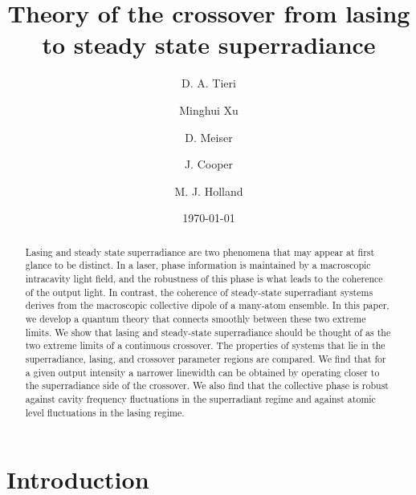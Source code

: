 \documentclass[aps,
twocolumn,
showpacs,
superscriptaddress,groupedaddress]{revtex4}
\begin{document}
\title{Theory of the crossover from lasing to steady state superradiance}
\author{D. A. Tieri}
\author{Minghui Xu}
\author{D. Meiser}
\author{J. Cooper}
\author{M. J. Holland}
\date{\today}

\begin{abstract}
  Lasing and steady state superradiance are two phenomena that may
  appear at first glance to be distinct.  In a laser, phase
  information is maintained by a macroscopic intracavity light field,
  and the robustness of this phase is what leads to the coherence of
  the output light.  In contrast, the coherence of steady-state
  superradiant systems derives from the macroscopic collective dipole
  of a many-atom ensemble.  In this paper, we develop a quantum theory
  that connects smoothly between these two extreme limits.  We show
  that lasing and steady-state superradiance should be thought of as
  the two extreme limits of a continuous crossover. The properties of
  systems that lie in the superradiance, lasing, and crossover
  parameter regions are compared.  We find that for a given output
  intensity a narrower linewidth can be obtained by operating closer
  to the superradiance side of the crossover.  We also find that the
  collective phase is robust against cavity frequency fluctuations in
  the superradiant regime and against atomic level fluctuations in the
  lasing regime.
\end{abstract}



\maketitle


\section{Introduction}
\end{document}
